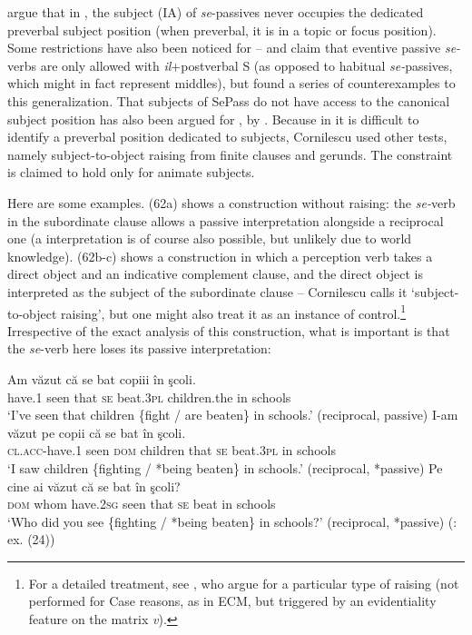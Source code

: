 \documentclass[output=paper]{langsci/langscibook}
\begin{document}
\citet{Raposo1996} argue that in , the subject (IA) of \textit{se}{}-passives never occupies the dedicated preverbal subject position (when preverbal, it is in a topic or focus position). Some restrictions have also been noticed for  – \citet{Stéfanini1962} and \citet{Ruwet1972} claim that eventive passive \textit{se-}verbs are only allowed with  \textit{il}+postverbal S (as opposed to habitual \textit{se-}passives, which might in fact represent middles), but \citet{Zribi-Hertz1982,Zribi-Hertz2008} found a series of counterexamples to this generalization. That subjects of SePass do not have access to the canonical subject position has also been argued for , by \citet{Cornilescu1998}. Because in  it is difficult to identify a preverbal position dedicated to subjects, Cornilescu used other tests, namely subject-to-object raising from finite clauses and gerunds. The constraint is claimed to hold only for animate subjects.

Here are some examples. (62a) shows a construction without raising: the \textit{se-}verb in the subordinate clause allows a passive interpretation alongside a reciprocal one (a  interpretation is of course also possible, but unlikely due to world knowledge). (62b-c) shows a construction in which a perception verb takes a direct object and an indicative complement clause, and the direct object is interpreted as the subject of the subordinate clause – Cornilescu calls it ‘subject-to-object raising', but one might also treat it as an instance of control.\footnote{For a detailed treatment, see \citet{Alboiu2013,Alboiu2016}, who argue for a particular type of raising (not performed for Case reasons, as in ECM, but triggered by an evidentiality feature on the matrix \textit{v}).} Irrespective of the exact analysis of this construction, what is important is that the \textit{se}{}-verb here loses its passive interpretation:

\ea%
    \label{ex:giurgea:62}
\ea
    \gll Am     văzut că   se bat          copiii           în şcoli.\\
          have.\textsc{1} seen that \textsc{se} beat.\textsc{3pl} children.the in schools\\
    \glt ‘I’ve seen that children \{fight / are beaten\} in schools.’ (reciprocal, passive)
\ex
    \gll  I-am              văzut pe    copii      că   se  bat         în şcoli.\\
          \textsc{cl.acc-}have.\textsc{1} seen  \textsc{dom} children that \textsc{se} beat.\textsc{3pl} in schools\\
    \glt  ‘I saw children \{fighting / *being beaten\} in schools.’ (reciprocal, *passive)
\ex
    \gll Pe    cine     ai            văzut că   se bat  în şcoli?\\
         \textsc{dom} whom have.\textsc{2sg} seen that \textsc{se} beat in schools\\
    \glt ‘Who did you see \{fighting / *being beaten\} in schools?’ (reciprocal, *passive) (\citealt{Cornilescu1998}: ex. (24))   
\z
\z
\end{document}
